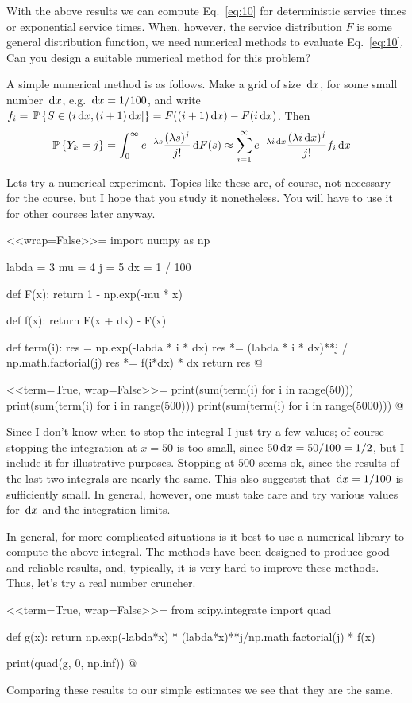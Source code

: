 \begin{question}
 With the above results we can compute
  Eq.~\eqref{eq:10} for deterministic service times or exponential
  service times. When, however, the service distribution $F$ is some
  general distribution function, we need numerical methods to evaluate
  Eq.~\eqref{eq:10}. Can you design a suitable numerical method for
  this problem?
  \begin{solution}
  A simple numerical method is as follows. Make a grid of
  size $\,\text{d}x$, for some small number $\,\text{d}x$, e.g. $\,\text{d}x=1/100$, and write
  $f_i = \,\mathbb{P}\left\{S\in(i\,\text{d}x, (i+1)\,\text{d}x]\right\} = F((i+1)\,\text{d}x) - F(i\,\text{d}x)$. Then 
  \begin{equation*}
    \begin{split}
  \,\mathbb{P}\left\{Y_k = j\right\} 
&= \int_0^\infty e^{-\lambda s}\frac{(\lambda s)^j}{j!} \,\text{d}F(s) 
\approx \sum_{i=1}^\infty e^{-\lambda i \,\text{d}x}\frac{(\lambda i\,\text{d}x)^j}{j!} f_i \,\text{d}x
    \end{split}
\end{equation*}

Lets try a numerical experiment. Topics like these are, of course, not
necessary for the course, but I hope that you study it nonetheless.
You will have to use it for other courses later anyway.

<<wrap=False>>=
import numpy as np

labda = 3
mu = 4
j = 5
dx = 1 / 100


def F(x):
    return 1 - np.exp(-mu * x)


def f(x):
    return F(x + dx) - F(x)


def term(i):
    res = np.exp(-labda * i * dx)
    res *= (labda * i * dx)**j / np.math.factorial(j)
    res *= f(i*dx) * dx
    return res
@

<<term=True, wrap=False>>=
print(sum(term(i) for i in range(50)))
print(sum(term(i) for i in range(500)))
print(sum(term(i) for i in range(5000)))
@

Since I don't know when to stop the integral I just try a few values;
of course stopping the integration at $x=50$ is too small, since
$50\,\text{d}x=50/100=1/2$, but I include it for illustrative
purposes. Stopping at $500$ seems ok, since the results of the last
two integrals are nearly the same. This also suggestst that
$\,\text{d}x=1/100$ is sufficiently small. In general, however, one must take
care and try various values for $\,\text{d}x$ and the integration limits.


In general, for more complicated situations is it best to use a
numerical library to compute the above integral. The methods have been
designed to produce good and reliable results, and, typically, it is
very hard to improve these methods. Thus, let's try a real number
cruncher.

<<term=True, wrap=False>>=
from scipy.integrate import quad

def g(x):
    return np.exp(-labda*x) * (labda*x)**j/np.math.factorial(j) * f(x)

print(quad(g, 0, np.inf))
@

Comparing these results to our simple estimates we see that they are
the same.
\end{solution}
\end{question}


